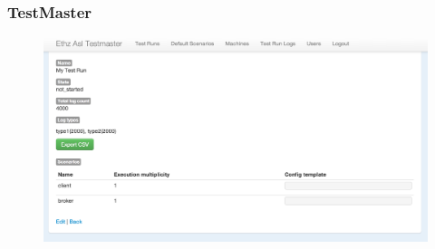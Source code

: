 \documentclass{beamer}
\begin{document}
\begin{frame}
\frametitle{TestMaster}
\begin{figure}
  \begin{center}
    \includegraphics[scale=0.3]{../../drawings/TestMaster05.png}
  \end{center}
  \label{fig:testsystem}
\end{figure}
\end{frame}
\end{document}
